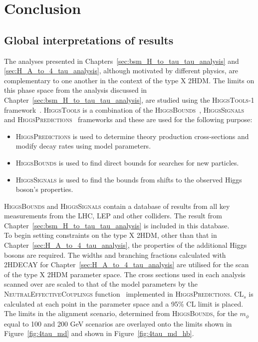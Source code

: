 \chapter{Conclusion}
\label{sec:conclusion}

\section{Global interpretations of results}

The analyses presented in Chapters~\ref{sec:bsm_H_to_tau_tau_analysis} and \ref{sec:H_A_to_4_tau_analysis}, although motivated by different physics, are complementary to one another in the context of the type X \ac{2HDM}.
The limits on this phase space from the analysis discussed in Chapter~\ref{sec:bsm_H_to_tau_tau_analysis}, are studied using the \textsc{HiggsTools-1} framework~\cite{Bahl:2022igd}.
\textsc{HiggsTools} is a combination of the \textsc{HiggsBounds}~\cite{Bechtle:2020pkv}, \textsc{HiggsSignals}~\cite{Bechtle:2020uwn} and \textsc{HiggsPredictions}~\cite{Bahl:2022igd} frameworks and these are used for the following purpose:

\begin{itemize}
\item \textsc{HiggsPredictions} is used to determine theory production cross-sections and modify decay rates using model parameters.
\item \textsc{HiggsBounds} is used to find direct bounds for searches for new particles.
\item \textsc{HiggsSignals} is used to find the bounds from shifts to the observed Higgs boson's properties.
\end{itemize}

\textsc{HiggsBounds} and \textsc{HiggsSignals} contain a database of results from all key measurements from the \ac{LHC}, \ac{LEP} and other colliders.
The result from Chapter~\ref{sec:bsm_H_to_tau_tau_analysis} is included in this database. \\

To begin setting constraints on the type X \ac{2HDM}, other than that in Chapter~\ref{sec:H_A_to_4_tau_analysis}, the properties of the additional Higgs bosons are required.
The widths and branching fractions calculated with \textsc{2HDECAY} for Chapter~\ref{sec:H_A_to_4_tau_analysis} are utilised for the scan of the type X 2HDM parameter space.
The cross sections used in each analysis scanned over are scaled to that of the model parameters by the \textsc{NeutralEffectiveCouplings} function~\cite{Bechtle:2020pkv} implemented in \textsc{HiggsPredictions}.
CL$_s$ is calculated at each point in the parameter space and a 95\% \ac{CL} limit is placed.
The limits in the alignment scenario, determined from \textsc{HiggsBounds}, for the $m_{\phi}$ equal to 100 and 200 GeV scenarios are overlayed onto the limits shown in Figure~\ref{fig:4tau_md} and shown in Figure~\ref{fig:4tau_md_hb}. \\

